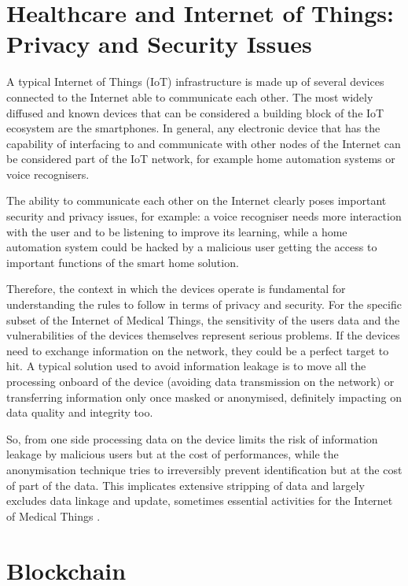 \documentclass[preprint]{elsarticle}
\begin{document}
\section{Healthcare and Internet of Things: Privacy and Security Issues}

A typical Internet of Things (IoT) infrastructure is made up of several devices connected to the Internet able to communicate each other. The most widely diffused and known devices that can be considered a building block of the IoT ecosystem are the smartphones. In general, any electronic device that has the capability of interfacing to and communicate with other nodes of the Internet can be considered part of the IoT network, for example home automation systems or voice recognisers. 

The ability to communicate each other on the Internet clearly poses important security and privacy issues, for example: a voice recogniser needs more interaction with the user and to be listening to improve its learning, while a home automation system could be hacked by a malicious user getting the access to important functions of the smart home solution.

Therefore, the context in which the devices operate is fundamental for understanding the rules to follow in terms of privacy and security. For the specific subset of the Internet of Medical Things, the sensitivity of the users data and the vulnerabilities of the devices themselves represent serious problems. If the devices need to exchange information on the network, they could be a perfect target to hit. A typical solution used to avoid information leakage is to move all the processing onboard of the device (avoiding data transmission on the network) or transferring information only once masked or anonymised, definitely impacting on data quality and integrity too. 

So, from one side processing data on the device limits the risk of information leakage by malicious users but at the cost of performances, while the anonymisation technique tries to irreversibly prevent identification but at the cost of part of the data. This implicates extensive stripping of data and largely excludes data linkage and update, sometimes essential activities for the Internet of Medical Things \cite{mostert2016big}.

\section{Blockchain}
\end{document}
